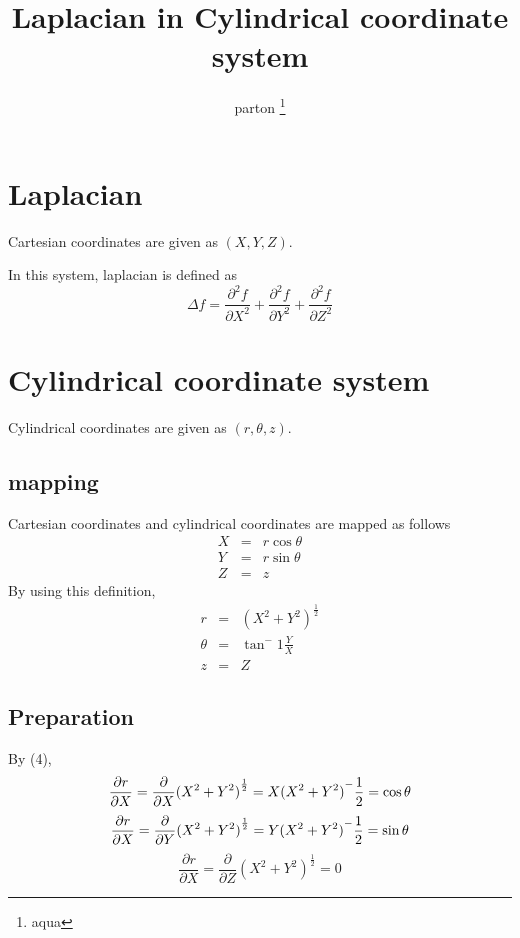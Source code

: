 \documentclass[a4j,10pt]{jsarticle}
\begin{document}

\title{ Laplacian in Cylindrical coordinate system}

\author{
    parton \thanks{aqua}
}


\maketitle
\thispagestyle{empty}

\section{Laplacian}
Cartesian coordinates are given as $(X, Y, Z)$.

In this system,  laplacian is defined as
$$\Delta f = \frac{\partial ^ 2 f}{\partial X^2} + \frac{\partial ^ 2 f}{\partial Y^2} + \frac{\partial ^ 2 f}{\partial Z^2}$$

\section{Cylindrical coordinate system}
Cylindrical coordinates are given as $(r, \theta, z)$.
\subsection{mapping}
Cartesian coordinates and cylindrical coordinates are mapped as follows
\begin{eqnarray}
X &=& r\cos \theta \\
Y &=& r\sin \theta \\
Z &=&z 
\end{eqnarray}
By using this definition, 
\begin{eqnarray}
r  &=& {(X^2 + Y^2)}^\frac{1}{2} \\
\theta &=& \tan^-1 \frac{Y}{X} \\
z  &=& Z 
\end{eqnarray}


\subsection{Preparation}
By (4), 
\begin{equation}
\frac{\partial r}{\partial X} = \frac{\partial}{\partial X} {(X^2 + Y^2)}^\frac{1}{2}\\ 
=  X{(X^2 + Y^2)}^-\frac{1}{2}\\
=\cos \theta \\
\end{equation}
\begin{equation}
\frac{\partial r}{\partial X} = \frac{\partial}{\partial Y} {(X^2 + Y^2)}^\frac{1}{2}\\ 
=  Y{(X^2 + Y^2)}^-\frac{1}{2}\\
=\sin \theta \\
\end{equation}
\begin{equation}
\frac{\partial r}{\partial X} = \frac{\partial}{\partial Z} {(X^2 + Y^2)}^\frac{1}{2} = 0 
\end{equation}
\end{document}
